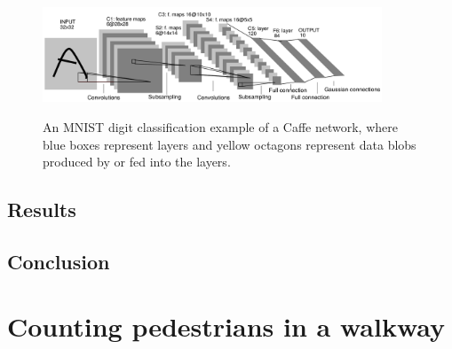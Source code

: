 \begin{figure}[H]
	\centering
	{\includegraphics[width=0.9\textwidth]{images/digitnet}}
	\caption{An MNIST digit classification example of a Caffe network, where blue boxes represent layers and yellow octagons represent data blobs produced by or fed into the layers\cite{jia2014caffe}.}
	\label{fig:digitnet}
\end{figure}

\subsection{Results}
\subsection{Conclusion}

\section{Counting pedestrians in a walkway}